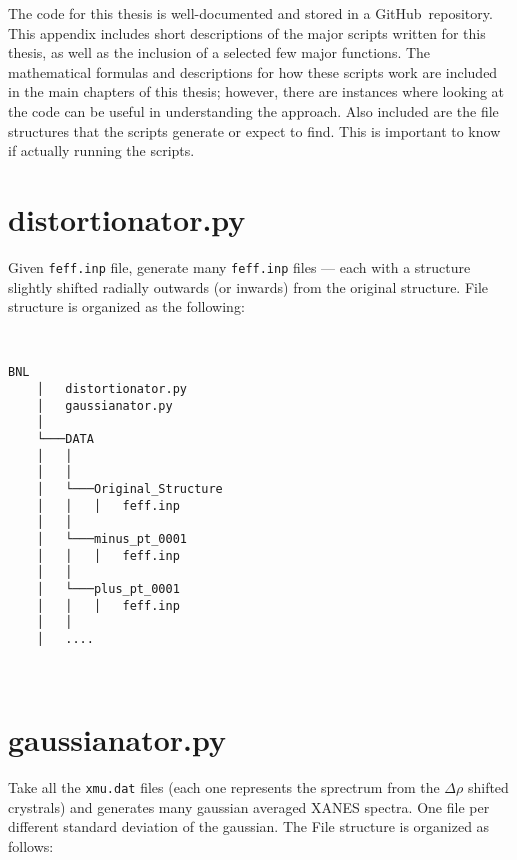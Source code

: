 
The code for this thesis is well-documented and stored in a GitHub\texttrademark ~repository. This appendix includes short descriptions of the major scripts written for this thesis, as well as the inclusion of a selected few major functions. The mathematical formulas and descriptions for how these scripts work are included in the main chapters of this thesis; however, there are instances where looking at the code can be useful in understanding the approach. Also included are the file structures that the scripts generate or expect to find. This is important to know if actually running the scripts.

\section{distortionator.py}
Given \texttt{feff.inp} file, generate many \texttt{feff.inp} files --- each with a structure slightly shifted radially outwards (or inwards) from the original structure. File structure is organized as the following: 

\begin{minipage}{\linewidth}
~ \\
\begin{Verbatim}[samepage=true]
    BNL
    │   distortionator.py
    │   gaussianator.py
    │       
    └───DATA
    │   │       
    │   │
    │   └───Original_Structure
    │   │   │   feff.inp
    │   │       
    │   └───minus_pt_0001
    │   │   │   feff.inp
    │   │       
    │   └───plus_pt_0001
    │   │   │   feff.inp
    │   │
    │   ....        
\end{Verbatim}
~
\end{minipage}

\section{gaussianator.py} \label{appendix:gaussianator}
Take all the \texttt{xmu.dat} files (each one represents the sprectrum from the $\Delta \rho$ shifted crystrals) and generates many gaussian averaged XANES spectra. One file per different standard deviation of the gaussian. The File structure is organized as follows: 

